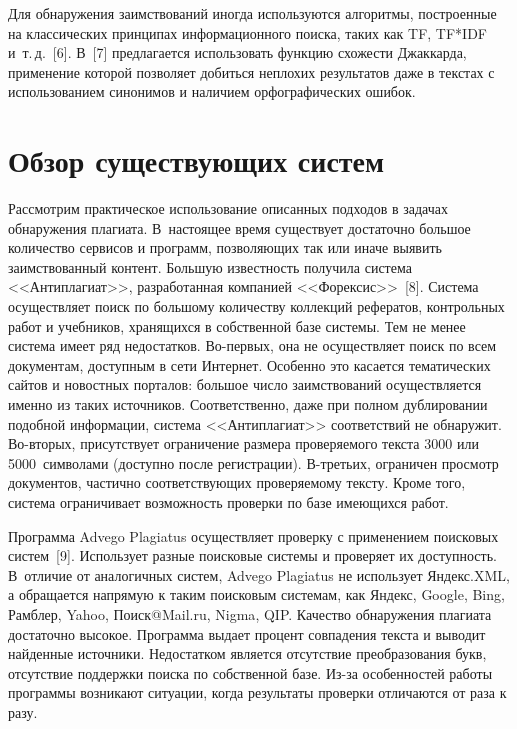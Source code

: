 \begin{multicols}{2}
  Для обнаружения заимствований иногда используются алгоритмы, 
построенные на классических принципах информационного поиска, таких как 
{TF}, {TF*IDF} и~т.\,д.~[6]. В~[7] предлагается использовать 
функцию схожести Джаккарда, применение которой позволяет добиться 
неплохих результатов даже в текстах с использованием синонимов и наличием 
орфографических ошибок.

\section{Обзор существующих систем}

  Рассмотрим практическое использование описанных подходов в задачах 
обнаружения плагиата. В~настоящее время существует достаточно большое 
количество сервисов и программ, позволяющих так или иначе выявить 
заимствованный контент. Большую известность получила сис\-те\-ма 
<<Антиплагиат>>, разработанная компанией <<Форексис>>~[8]. Сис\-те\-ма 
осуществляет поиск по большому количеству коллекций рефератов, 
контрольных работ и учебников, хранящихся в собственной базе сис\-те\-мы. 
Тем не менее сис\-те\-ма имеет ряд недостатков. Во-пер\-вых, она не 
осуществляет поиск по всем документам, доступным в сети Интернет. 
Особенно это касается тематических сайтов и новостных порталов: большое 
число заимствований осуществляется именно из таких источников. 
Соответственно, даже при полном дублировании подобной информации, 
  сис\-те\-ма <<Антиплагиат>> соответствий не обнаружит. Во-вто\-рых, 
присутствует ограничение размера проверяемого текста 3000 или 
5000~символами (доступно после регистрации). В-третьих, ограничен просмотр 
документов, частично соответствующих проверяемому тексту. Кроме того, 
сис\-те\-ма ограничивает возможность проверки по базе имеющихся работ.
  
  Программа {Advego Plagiatus} осуществляет проверку с применением 
поисковых сис\-тем~[9]. Использует разные поисковые сис\-те\-мы и проверяет 
их доступность. В~отличие от аналогичных сис\-тем, {Advego Plagiatus} 
не использует Яндекс.XML, а обращается напрямую к таким поисковым 
сис\-те\-мам, как Яндекс, {Google}, {Bing}, Рамблер, {Yahoo}, 
\mbox{Поиск@Mail.ru}, {Nigma}, {QIP}. Качество обнаружения 
плагиата достаточно высокое. Программа выдает процент совпадения текста и 
выводит найденные источники. Недостатком является отсутствие 
преобразования букв, отсутствие поддержки поиска по собственной базе. Из-за 
особенностей работы программы возникают ситуации, когда результаты 
проверки отличаются от раза к разу. 
  

\end{multicols}
